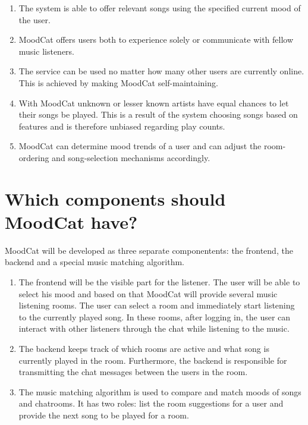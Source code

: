 \begin{enumerate}
\item The system is able to offer relevant songs using the specified current mood of the user.

\item MoodCat offers users both to experience solely or communicate with fellow music listeners.

\item The service can be used no matter how many other users are currently online.
This is achieved by making MoodCat self-maintaining.

\item With MoodCat unknown or lesser known artists have equal chances to let their songs be played.
This is a result of the system choosing songs based on features and is therefore unbiased regarding play counts.

\item MoodCat can determine mood trends of a user and can adjust the room-ordering and song-selection mechanisms accordingly.

\end{enumerate}

\chapter{Which components should MoodCat have?}
MoodCat will be developed as three separate componentents: the frontend, the backend and a special music matching algorithm.

\begin{enumerate}
\item The frontend will be the visible part for the listener.
The user will be able to select his mood and based on that MoodCat will provide several music listening rooms.
The user can select a room and immediately start listening to the currently played song.
In these rooms, after logging in, the user can interact with other listeners through the chat while listening to the music.

\item The backend keeps track of which rooms are active and what song is currently played in the room.
Furthermore, the backend is responsible for transmitting the chat messages between the users in the room.

\item The music matching algorithm is used to compare and match moods of songs and chatrooms.
It has two roles: list the room suggestions for a user and provide the next song to be played for a room.
\end{enumerate}

